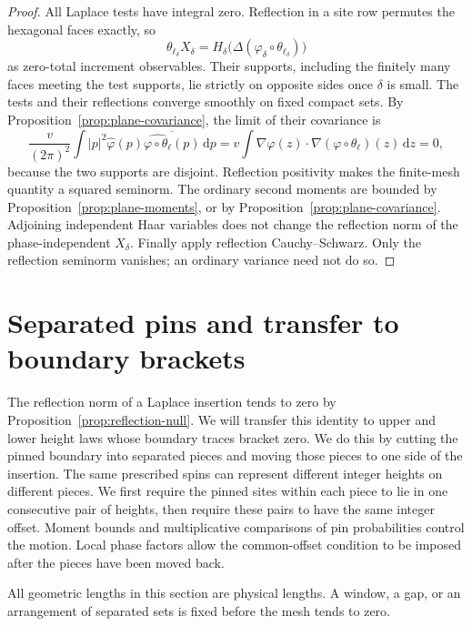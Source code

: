 \documentclass[11pt]{article}
\newcommand{\dd}{\,\mathrm d}
\theoremstyle{definition}
\theoremstyle{remark}
\numberwithin{equation}{section}
\begin{document}
\begin{proof}
All Laplace tests have integral zero.  Reflection in a site row
permutes the hexagonal faces exactly, so
\[
 \theta_{\ell_\delta}X_\delta
   =H_\delta\bigl(\Delta(\varphi_\delta\circ\theta_{\ell_\delta})\bigr)
\]
as zero-total increment observables.  Their supports, including the
finitely many faces meeting the test supports, lie strictly on
opposite sides once $\delta$ is small.  The tests and their reflections
converge smoothly on fixed compact sets.  By
Proposition~\ref{prop:plane-covariance}, the limit of their covariance is
\[
 \frac{v}{(2\pi)^2}\int |p|^2\widehat\varphi(p)
             \overline{\widehat{\varphi\circ\theta_\ell}(p)}\dd p
    =v\int\nabla\varphi(z)\cdot
                   \nabla(\varphi\circ\theta_\ell)(z)\dd z=0,
\]
because the two supports are disjoint.  Reflection positivity makes
the finite-mesh quantity a squared seminorm.  The ordinary second
moments are bounded by Proposition~\ref{prop:plane-moments}, or by
Proposition~\ref{prop:plane-covariance}.  Adjoining independent Haar
variables does not change the reflection norm of the phase-independent
$X_\delta$.  Finally apply reflection Cauchy--Schwarz.  Only the
reflection seminorm vanishes; an ordinary variance need not do so.
\end{proof}

\section{Separated pins and transfer to boundary brackets}\label{sec:pins}

The reflection norm of a Laplace insertion tends to zero by
Proposition~\ref{prop:reflection-null}.  We will transfer this identity to
upper and lower height laws whose boundary traces bracket zero.  We do
this by cutting the pinned boundary into separated pieces and moving
those pieces to one side of the insertion.  The same prescribed spins
can represent different integer heights on different pieces.  We first
require the pinned sites within each piece to lie in one consecutive
pair of heights, then require these pairs to have the same integer
offset.  Moment bounds and multiplicative comparisons of pin
probabilities control the motion.  Local phase factors allow the
common-offset condition to be imposed after the pieces have been moved
back.

All geometric lengths in this section are physical lengths.  A window,
a gap, or an arrangement of separated sets is fixed before the mesh
tends to zero.
\end{document}
